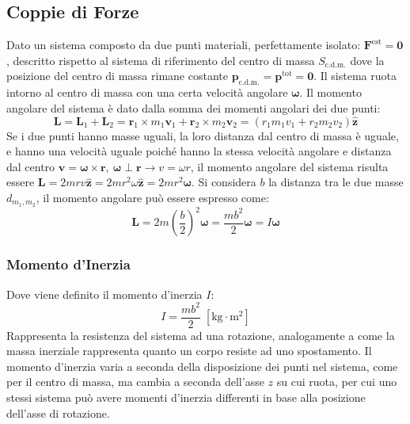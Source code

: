 \documentclass{article}
\newcommand{\vect}[1]{\boldsymbol{\mathbf{#1}}}
\numberwithin{equation}{subsection}
\begin{document}
\subsection{Coppie di Forze}

Dato un sistema composto da due punti materiali, perfettamente 
isolato: $\vect{F}^\mathrm{est}=\vect{0}$, descritto rispetto al sistema di riferimento del centro di massa $S_{\mathrm{c.d.m.}}$ 
dove la posizione del centro 
di massa rimane costante $\vect{p}_{\mathrm{c.d.m.}}=\vect{p}^\mathrm{tot}=\vect{0}$. 
Il sistema ruota intorno al centro di massa con una certa 
velocità angolare $\vect{\omega}$. Il momento angolare del sistema 
è dato dalla somma dei momenti angolari dei due punti: 
\begin{equation*}
    \vect{L}=\vect{L}_1+\vect{L}_2=\vect{r}_1\times m_1\vect{v}_1+\vect{r}_2\times m_2\vect{v}_2=(r_1m_1v_1+r_2m_2v_2)\hat{\vect{z}}
\end{equation*}
Se i due punti hanno masse uguali, la loro distanza dal centro di 
massa è uguale, e hanno una velocità uguale poiché hanno la stessa 
velocità angolare e distanza dal centro $\vect{v}=\vect{\omega}\times\vect{r},\:\vect{\omega}\perp\vect{r}\rightarrow v=\omega r$, 
il momento angolare del sistema risulta essere $\vect{L}=2mrv\hat{\vect{z}}=2mr^2\omega\hat{\vect{z}}=2mr^2\vect{\omega}$. 
Si considera $b$ la distanza tra le due masse $d_{m_1,m_2}$, 
il momento angolare può essere espresso come:
\begin{equation}
    \vect{L}=\displaystyle 2m\left(\frac{b}{2}\right)^2\vect{\omega}=\frac{mb^2}{2}\vect{\omega}=I\vect{\omega}
\end{equation}

\subsubsection{Momento d'Inerzia}

Dove viene definito il momento d'inerzia $I$:
\begin{equation*}
    I=\displaystyle\frac{mb^2}{2}\;\left[\mathrm{kg}\cdot \mathrm{m}^2\right]
\end{equation*}
Rappresenta la resistenza del sistema ad una rotazione, analogamente a come  
la massa inerziale rappresenta quanto un corpo resiste ad uno spostamento. Il momento d'inerzia varia a seconda della disposizione dei punti nel sistema, come per il centro 
di massa, ma cambia a seconda dell'asse $z$ su cui ruota, per cui uno stessi sistema può avere momenti d'inerzia differenti in base alla posizione dell'asse di rotazione. 
\end{document}
